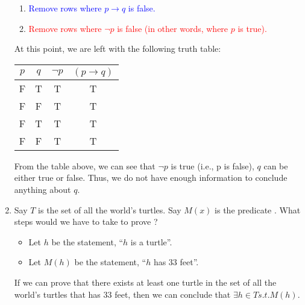 \documentclass{article}
\begin{document}
\begin{enumerate}
          \begin{enumerate}
              \item \textcolor{blue}{Remove rows where $p \rightarrow q$ is false.}
              \item \textcolor{red}{Remove rows where $\neg p$ is false (in other words, where $p$ is true).}
          \end{enumerate}

          At this point, we are left with the following truth table:

          \begin{table}[h]
              \centering
              \begin{tabular}{|c|c||c|c|}
                  \hline
                  $p$ & $q$ & $\neg p$ & $(p \rightarrow q)$ \\ \hline
                  \hline
                  F   & T   & T        & T                   \\ \hline
                  F   & F   & T        & T                   \\ \hline
                  F   & T   & T        & T                   \\ \hline
                  F   & F   & T        & T                   \\ \hline
              \end{tabular}
          \end{table}

          From the table above, we can see that $\neg p$ is true (i.e., p is false), $q$
          can be either true or false. Thus, we do not have enough information to
          conclude anything about $q$.

          \newpage

    \item Say $T$ is the set of all the world's turtles. Say $M(x)$ is the predicate
          . What steps would we have to take to prove ?

          \begin{itemize}
              \item Let $h$ be the statement, ``$h$ is a turtle''.
              \item Let $M(h)$ be the statement, ``$h$ has $33$ feet''.
          \end{itemize}
          If we can prove that there exists at least one turtle in the set of all the world's turtles that has $33$ feet, then we can conclude that $\exists h \in T    s.t. M(h)$.


\end{enumerate}
\end{document}
